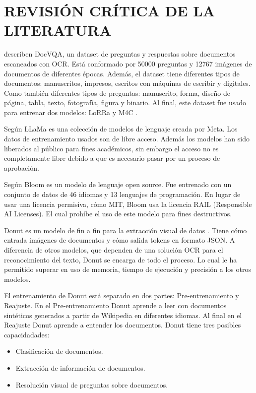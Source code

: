 \documentclass[../main.tex]{subfiles}
\begin{document}
\chapter{REVISIÓN CRÍTICA DE LA LITERATURA}


\citet{mathew2021docvqa} describen DocVQA,
un dataset de preguntas y respuestas sobre documentos escaneados con OCR.
Está conformado por 50000 preguntas y 12767 imágenes de documentos de diferentes épocas.
Además, el dataset tiene diferentes tipos de documentos:
manuscritos, impresos, escritos con máquinas de escribir y digitales.
Como también diferentes tipos de preguntas:
manuscrito, forma, diseño de página, tabla, texto, fotografía, figura y binario.
Al final, este dataset fue usado para entrenar dos modelos:
LoRRa \cite{anderson2018bottomup} y M4C \cite{devlin2019bert}.

Según \citet{touvron2023llama} LLaMa es una colección de modelos de lenguaje creada por Meta.
Los datos de entrenamiento usados son de libre acceso.
Además los modelos han sido liberados al público para fines académicos,
sin embargo el acceso no es completamente libre debido a que es necesario pasar por un proceso de aprobación.

Según \citet{workshop2023bloom}
Bloom es un modelo de lenguaje open source.
Fue entrenado con un conjunto de datos de 46 idiomas y 13 lenguajes de programación.
En lugar de usar una licencia permisiva, cómo MIT, Bloom usa la licencia RAIL (Responsible AI Licenses).
El cual prohíbe el uso de este modelo para fines destructivos.

Donut es un modelo de fin a fin para la extracción visual de datos \cite{kim2022ocrfree}.
Tiene cómo entrada imágenes de documentos y cómo salida tokens en formato JSON.
A diferencia de otros modelos, que dependen de una solución OCR para el reconocimiento del texto,
Donut se encarga de todo el proceso.
Lo cual le ha permitido superar en uso de memoria, tiempo de ejecución y precisión a los otros modelos.

El entrenamiento de Donut está separado en dos partes: Pre-entrenamiento y Reajuste.
En el Pre-entrenamiento Donut aprende a leer con documentos sintéticos generados a partir de Wikipedia en diferentes idiomas.
Al final en el Reajuste Donut aprende a entender los documentos.
Donut tiene tres posibles capacidadades:
\begin{itemize}
	\item Clasificación de documentos.
	\item Extracción de información de documentos.
	\item Resolución visual de preguntas sobre documentos.
\end{itemize}
\end{document}
